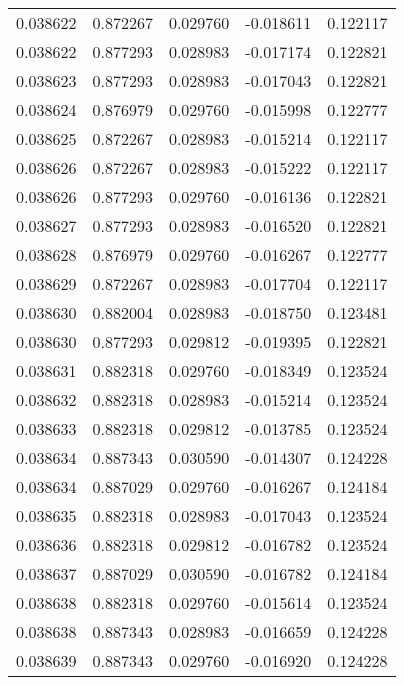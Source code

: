 \begin{tabular}{lrrrr}
0.038622    &  0.872267 &  0.029760 & -0.018611 &             0.122117 \\
0.038622    &  0.877293 &  0.028983 & -0.017174 &             0.122821 \\
0.038623    &  0.877293 &  0.028983 & -0.017043 &             0.122821 \\
0.038624    &  0.876979 &  0.029760 & -0.015998 &             0.122777 \\
0.038625    &  0.872267 &  0.028983 & -0.015214 &             0.122117 \\
0.038626    &  0.872267 &  0.028983 & -0.015222 &             0.122117 \\
0.038626    &  0.877293 &  0.029760 & -0.016136 &             0.122821 \\
0.038627    &  0.877293 &  0.028983 & -0.016520 &             0.122821 \\
0.038628    &  0.876979 &  0.029760 & -0.016267 &             0.122777 \\
0.038629    &  0.872267 &  0.028983 & -0.017704 &             0.122117 \\
0.038630    &  0.882004 &  0.028983 & -0.018750 &             0.123481 \\
0.038630    &  0.877293 &  0.029812 & -0.019395 &             0.122821 \\
0.038631    &  0.882318 &  0.029760 & -0.018349 &             0.123524 \\
0.038632    &  0.882318 &  0.028983 & -0.015214 &             0.123524 \\
0.038633    &  0.882318 &  0.029812 & -0.013785 &             0.123524 \\
0.038634    &  0.887343 &  0.030590 & -0.014307 &             0.124228 \\
0.038634    &  0.887029 &  0.029760 & -0.016267 &             0.124184 \\
0.038635    &  0.882318 &  0.028983 & -0.017043 &             0.123524 \\
0.038636    &  0.882318 &  0.029812 & -0.016782 &             0.123524 \\
0.038637    &  0.887029 &  0.030590 & -0.016782 &             0.124184 \\
0.038638    &  0.882318 &  0.029760 & -0.015614 &             0.123524 \\
0.038638    &  0.887343 &  0.028983 & -0.016659 &             0.124228 \\
0.038639    &  0.887343 &  0.029760 & -0.016920 &             0.124228 \\

\end{tabular}
